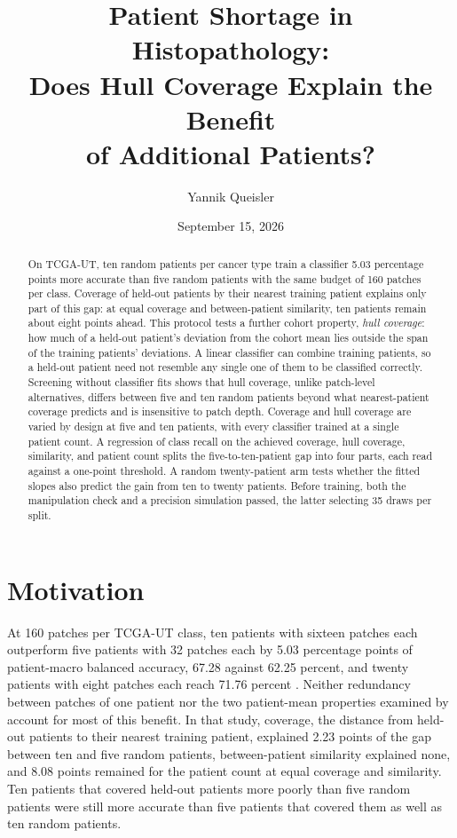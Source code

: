 \documentclass[11pt]{article}
\title{Patient Shortage in Histopathology:\\Does Hull Coverage Explain the Benefit\\of Additional Patients?}
\author{Yannik Queisler}
\date{September 15, 2026}
\begin{document}
\raggedbottom
{}
\setlength{\emergencystretch}{2em}
\maketitle
\begin{abstract}
\noindent On TCGA-UT, ten random patients per cancer type train a classifier 5.03 percentage points more accurate than five random patients with the same budget of 160 patches per class. Coverage of held-out patients by their nearest training patient explains only part of this gap: at equal coverage and between-patient similarity, ten patients remain about eight points ahead. This protocol tests a further cohort property, \emph{hull coverage}: how much of a held-out patient's deviation from the cohort mean lies outside the span of the training patients' deviations. A linear classifier can combine training patients, so a held-out patient need not resemble any single one of them to be classified correctly. Screening without classifier fits shows that hull coverage, unlike patch-level alternatives, differs between five and ten random patients beyond what nearest-patient coverage predicts and is insensitive to patch depth. Coverage and hull coverage are varied by design at five and ten patients, with every classifier trained at a single patient count. A regression of class recall on the achieved coverage, hull coverage, similarity, and patient count splits the five-to-ten-patient gap into four parts, each read against a one-point threshold. A random twenty-patient arm tests whether the fitted slopes also predict the gain from ten to twenty patients. Before training, both the manipulation check and a precision simulation passed, the latter selecting 35 draws per split.
\end{abstract}
\setcounter{tocdepth}{1}
\tableofcontents
\clearpage

\section{Motivation}
\label{sec:motivation}
At 160 patches per TCGA-UT class, ten patients with sixteen patches each outperform five patients with 32 patches each by 5.03 percentage points of patient-macro balanced accuracy, 67.28 against 62.25 percent, and twenty patients with eight patches each reach 71.76 percent \citep{queisler2026effectiveSupport}. Neither redundancy between patches of one patient \citep{queisler2026multidirectionalRedundancy} nor the two patient-mean properties examined by \citet{queisler2026shortageDecomposition} account for most of this benefit. In that study, coverage, the distance from held-out patients to their nearest training patient, explained 2.23 points of the gap between ten and five random patients, between-patient similarity explained none, and 8.08 points remained for the patient count at equal coverage and similarity. Ten patients that covered held-out patients more poorly than five random patients were still more accurate than five patients that covered them as well as ten random patients.
\end{document}
